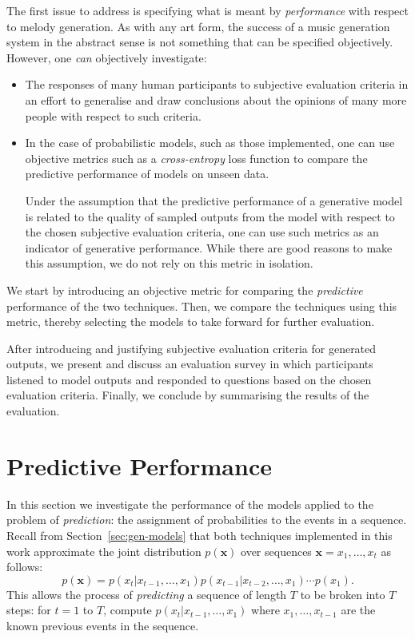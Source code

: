 \documentclass[12pt,a4paper,twoside,openright]{report}
\newcommand{\sref}[1]{Section~\ref{#1}}
\newcommand{\vect}[1]{\boldsymbol{\mathbf{#1}}}
\begin{document}
The first issue to address is specifying what is meant by \emph{performance}
with respect to melody generation. As with any art form, the success of a music
generation system in the abstract sense is not something that can be specified
objectively. However, one \emph{can} objectively investigate:
\begin{itemize}
  \item The responses of many human participants to subjective evaluation
    criteria in an effort to generalise and draw conclusions about the opinions
    of many more people with respect to such criteria.  
  \item In the case of probabilistic models, such as those implemented, one can
    use objective metrics such as a \emph{cross-entropy} loss function to
    compare the predictive performance of models on unseen data. 

    Under the assumption that the predictive performance of a generative model
    is related to the quality of sampled outputs from the model with respect to
    the chosen subjective evaluation criteria, one can use such metrics as an
    indicator of generative performance. While there are good reasons to make
    this assumption, we do not rely on this metric in isolation.
\end{itemize}

\vspace{4mm}

We start by introducing an objective metric for comparing the \emph{predictive}
performance of the two techniques. Then, we compare the techniques using this
metric, thereby selecting the models to take forward for further evaluation. 

After introducing and justifying subjective evaluation criteria for generated
outputs, we present and discuss an evaluation survey in which participants
listened to model outputs and responded to questions based on the chosen
evaluation criteria. Finally, we conclude by summarising the results of the
evaluation.

\section{Predictive Performance}

In this section we investigate the performance of the models applied to the
problem of \emph{prediction}: the assignment of probabilities to the events in a
sequence. Recall from \sref{sec:gen-models} that both techniques
implemented in this work approximate the joint distribution $p(\vect{x})$ over
sequences $\vect{x} = x_1,\ldots,x_t$ as follows:
$$ p(\vect{x}) = p(x_t | x_{t-1}, \ldots, x_1) p(x_{t-1} | x_{t-2}, \ldots, x_1)
\cdots p(x_1). $$
This allows the process of \emph{predicting} a sequence of length $T$ to be
broken into $T$ steps: for $t = 1$ to $T$, compute $p(x_t | x_{t-1}, \ldots,
x_1)$ where $x_1, \ldots, x_{t-1}$ are the known previous events in the
sequence. 
\end{document}
